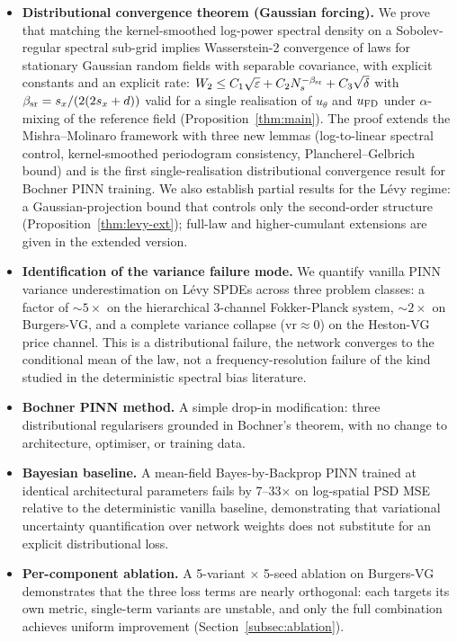 \documentclass[10pt]{elsarticle}
\begin{document}
\begin{itemize}
\item \textbf{Distributional convergence theorem (Gaussian forcing).}
We prove that matching the kernel-smoothed log-power spectral density
on a Sobolev-regular spectral sub-grid implies Wasserstein-2
convergence of laws for stationary Gaussian random fields with
separable covariance, with explicit constants and an explicit rate:
\(W_2 \leq C_1\sqrt{\varepsilon} + C_2 N_s^{-\beta_{\rm sr}}
+ C_3\sqrt{\delta}\) with $\beta_{\rm sr} = s_x/(2(2s_x+d))$ valid
for a single realisation of $u_\theta$ and $u_{\rm FD}$ under
$\alpha$-mixing of the reference field (Proposition~\ref{thm:main}).
The proof extends the Mishra--Molinaro framework with three new
lemmas (log-to-linear spectral control, kernel-smoothed
periodogram consistency, Plancherel--Gelbrich bound) and is the
first single-realisation distributional convergence result for
Bochner PINN training. We also establish partial results for the
L\'evy regime: a Gaussian-projection bound that controls only the
second-order structure
(Proposition~\ref{thm:levy-ext}); full-law and higher-cumulant extensions are given in the extended version.

\item \textbf{Identification of the variance failure mode.} We quantify
vanilla PINN variance underestimation on L\'evy SPDEs across three
problem classes: a factor of \(\sim 5\times\) on the hierarchical
3-channel Fokker-Planck system, \(\sim 2\times\) on Burgers-VG, and a
complete variance collapse (\(\mathrm{vr} \approx 0\)) on the
Heston-VG price channel. This is a distributional failure, the
network converges to the conditional mean of the law, not a
frequency-resolution failure of the kind studied in the deterministic
spectral bias literature.

\item \textbf{Bochner PINN method.} A simple drop-in modification:
three distributional regularisers grounded in Bochner's theorem, with
no change to architecture, optimiser, or training data.

\item \textbf{Bayesian baseline.} A mean-field Bayes-by-Backprop PINN
trained at identical architectural parameters fails by 7--33\(\times\)
on log-spatial PSD MSE relative to the deterministic vanilla baseline,
demonstrating that variational uncertainty quantification over network
weights does not substitute for an explicit distributional loss.

\item \textbf{Per-component ablation.} A 5-variant \(\times\) 5-seed
ablation on Burgers-VG demonstrates that the three loss terms are
nearly orthogonal: each targets its own metric, single-term
variants are unstable, and only the full combination achieves
uniform improvement (Section~\ref{subsec:ablation}).


\end{itemize}
\end{document}
